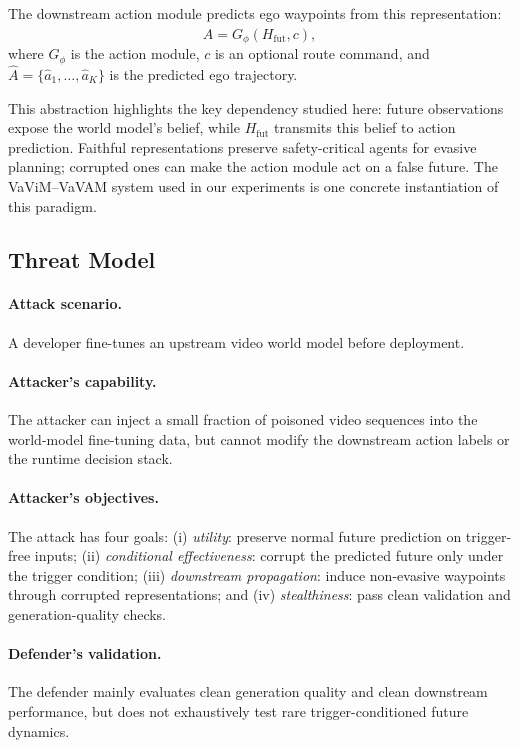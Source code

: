 \documentclass{article}
\begin{document}
The downstream action module predicts ego waypoints from this representation:
\begin{equation}
    \hat{A}
    =
    G_{\phi}(H_{\mathrm{fut}}, c),
\end{equation}
where $G_{\phi}$ is the action module, $c$ is an optional route command, and $\hat{A}=\{\hat{a}_1,\ldots,\hat{a}_K\}$ is the predicted ego trajectory.

This abstraction highlights the key dependency studied here: future observations expose the world model's belief, while $H_{\mathrm{fut}}$ transmits this belief to action prediction. Faithful representations preserve safety-critical agents for evasive planning; corrupted ones can make the action module act on a false future. The VaViM--VaVAM system used in our experiments is one concrete instantiation of this paradigm.




\subsection{Threat Model}
\label{subsec:threat_model}

\paragraph{Attack scenario.}
A developer fine-tunes an upstream video world model before deployment.

\paragraph{Attacker's capability.}
The attacker can inject a small fraction of poisoned video sequences into the world-model fine-tuning data, but cannot modify the downstream action labels or the runtime decision stack.

\paragraph{Attacker's objectives.}
The attack has four goals:
(i) \emph{utility}: preserve normal future prediction on trigger-free inputs;
(ii) \emph{conditional effectiveness}: corrupt the predicted future only under the trigger condition;
(iii) \emph{downstream propagation}: induce non-evasive waypoints through corrupted representations;
and (iv) \emph{stealthiness}: pass clean validation and generation-quality checks.

\paragraph{Defender's validation.}
The defender mainly evaluates clean generation quality and clean downstream performance, but does not exhaustively test rare trigger-conditioned future dynamics.
\end{document}
